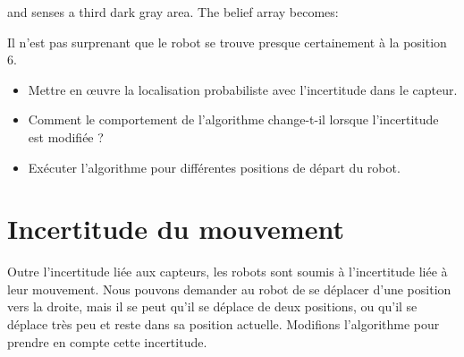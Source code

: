 \noindent{}and senses a third dark gray area. The belief array becomes:
\begin{center}
\end{center}
Il n'est pas surprenant que le robot se trouve presque certainement à la position 6.

\begin{framed}
\begin{itemize}
\item Mettre en œuvre la localisation probabiliste avec l'incertitude dans le capteur.
\item Comment le comportement de l'algorithme change-t-il lorsque l'incertitude est modifiée ?
\item Exécuter l'algorithme pour différentes positions de départ du robot.
\end{itemize}
\end{framed}

\section{Incertitude du mouvement}\label{s.uncertain-motion}

Outre l'incertitude liée aux capteurs, les robots sont soumis à l'incertitude liée à leur mouvement. Nous pouvons demander au robot de se déplacer d'une position vers la droite, mais il se peut qu'il se déplace de deux positions, ou qu'il se déplace très peu et reste dans sa position actuelle. Modifions l'algorithme pour prendre en compte cette incertitude.


